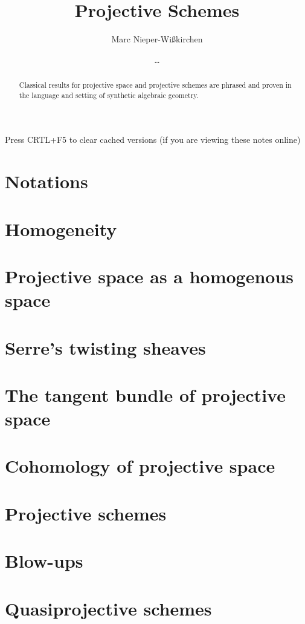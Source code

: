 \documentclass{../util/zariski}
\title{Projective Schemes}
\author{Marc Nieper-Wi\ss{}kirchen \and \dots}
\begin{document}
\maketitle

\begin{center}
  \color{purple}
  \large{Press CRTL+F5 to clear cached versions}
  \large{(if you are viewing these notes online)}
\end{center}

\begin{abstract}
  Classical results for projective space and projective schemes are
  phrased and proven in the language and setting of synthetic
  algebraic geometry.
\end{abstract}

\tableofcontents

\section{Notations}


\section{Homogeneity}


\section{Projective space as a homogenous space}

\section{Serre's twisting sheaves}

\section{The tangent bundle of projective space}

\section{Cohomology of projective space}

\section{Projective schemes}

\section{Blow-ups}

\section{Quasiprojective schemes}

\printindex

\printbibliography
\end{document}
